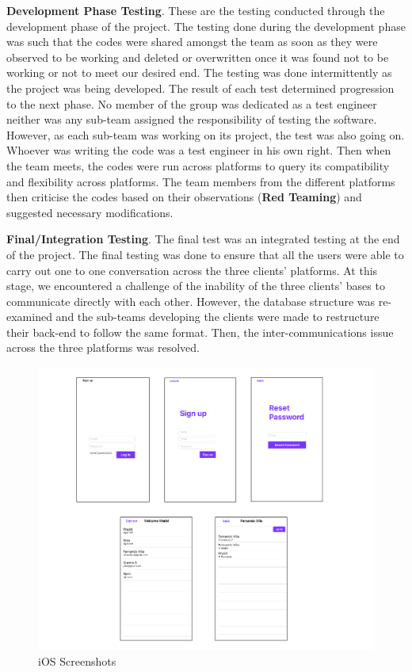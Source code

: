 \textbf{Development Phase Testing}.	These are the testing conducted through the development phase of the project.  The testing done during the development phase was such that the codes were shared amongst the team as soon as they were observed to be working and deleted or overwritten once it was found not to be working or not to meet our desired end. The testing was done intermittently as the project was being developed. The result of each test determined progression to the next phase. No member of the group was dedicated as a test engineer neither was any sub-team assigned the responsibility of testing the software. However, as each sub-team was working on its project, the test was also going on. Whoever was writing the code was a test engineer in his own right. Then when the team meets, the codes were run across platforms to query its compatibility and flexibility across platforms. The team members from the different platforms then criticise the codes based on their observations (\textbf{Red Teaming}) and suggested necessary modifications.

\textbf{Final/Integration Testing}. The final test was an integrated testing at the end of the project.  The final testing was done to ensure that all the users were able to carry out one to one conversation across the three clients’ platforms. At this stage, we encountered a challenge of the inability of the three clients’ bases to communicate directly with each other. However, the database structure was re-examined and the sub-teams developing the clients were made to restructure their back-end to follow the same format. Then, the inter-communications issue across the three platforms was resolved.   

\begin{figure}[ht]
\centering
\includegraphics[width=1\textwidth]{figs/IOSscreen}
	\caption{iOS Screenshots }
	\label{fig:IOSscreen}
\end{figure}

